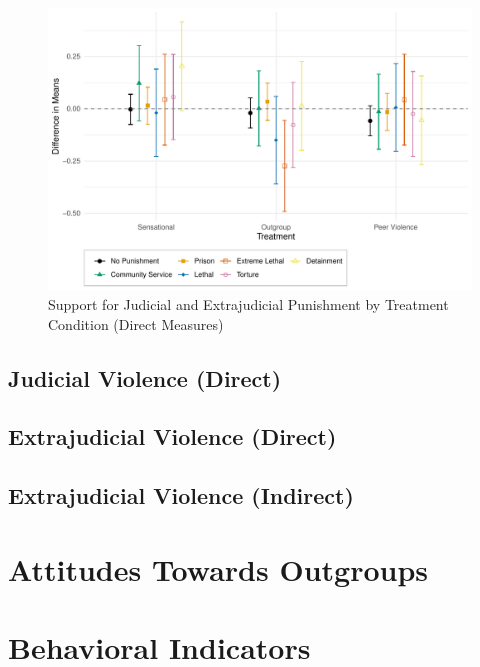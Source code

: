 \documentclass[]{article}
\begin{document}
\begin{figure}[!htbp]
  \centering
  \caption{Support for Judicial and Extrajudicial Punishment by Treatment Condition (Direct Measures)}
  \includegraphics[width=\textwidth]{figures/ATE_punish_hom_outcomes.pdf}
\end{figure}
\subsection{Judicial Violence (Direct)}



\subsection{Extrajudicial Violence (Direct)}



\subsection{Extrajudicial Violence (Indirect)}



{
\section{Attitudes Towards Outgroups}\vspace{-1em}

\vspace{-1.5em}

\section{Behavioral Indicators}\vspace{-1em}


}
\end{document}
